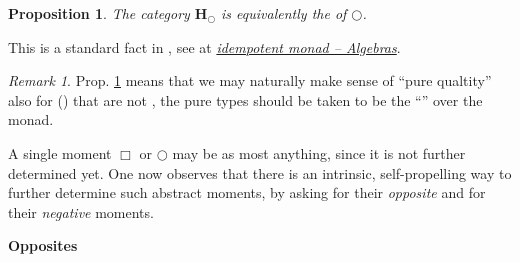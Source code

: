 \documentclass[12pt,titlepage]{article}
\theoremstyle{plain}
\newtheorem{prop}{Proposition}
\theoremstyle{definition}
\theoremstyle{remark}
\newtheorem{remark}{Remark}
\begin{document}
\begin{prop}
\label{bigcircpureObjectsAreEMObjects}\hypertarget{bigcircpureObjectsAreEMObjects}{}
The category $\mathbf{H}_{\bigcirc}$ is equivalently the  of $\bigcirc$.

\end{prop}
This is a standard fact in , see at \emph{\href{idempotent+monad#AlgebrasForAnIdempotentMonad}{idempotent monad -- Algebras}}.

\begin{remark}
\label{PurityForNonIdempotent}\hypertarget{PurityForNonIdempotent}{}
Prop. \ref{bigcircpureObjectsAreEMObjects} means that we may naturally make sense of ``pure qualtity'' also for () that are not , the pure types should be taken to be the ``'' over the monad.

\end{remark}
A single moment $\Box$ or $\bigcirc$ may be  as most anything, since it is not further determined yet. One now observes that there is an intrinsic, self-propelling way to further determine such abstract moments, by asking for their \emph{opposite} and for their \emph{negative} moments.

\textbf{Opposites}
\end{document}
